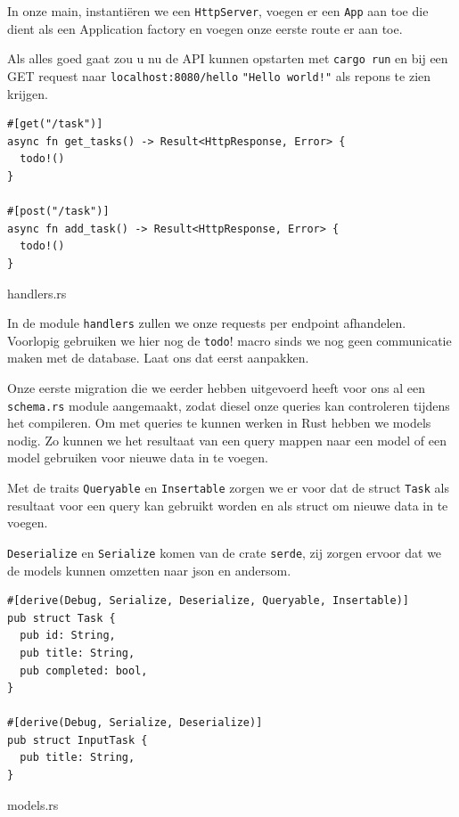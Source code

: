 In onze main, instantiëren we een \texttt{HttpServer}, voegen er een
\texttt{App} aan toe die dient als een
Application factory en voegen onze eerste route er aan toe.

Als alles goed gaat zou u nu de API kunnen opstarten met \texttt{cargo run} en bij een
GET request naar \texttt{localhost:8080/hello} \texttt{"Hello world!"} als repons 
te zien krijgen.

\begin{listing}[h]
\begin{verbatim}
#[get("/task")]
async fn get_tasks() -> Result<HttpResponse, Error> {
  todo!()
}

#[post("/task")]
async fn add_task() -> Result<HttpResponse, Error> {
  todo!()
}
\end{verbatim}
\caption{handlers.rs}
\end{listing}

In de module \texttt{handlers} zullen we onze requests per endpoint afhandelen. Voorlopig
gebruiken we hier nog de \texttt{todo}! macro sinds we nog geen communicatie maken met de
database. Laat ons dat eerst aanpakken.

Onze eerste migration die we eerder hebben uitgevoerd heeft voor ons al een
\texttt{schema.rs} module aangemaakt, zodat diesel onze queries kan controleren tijdens
het compileren. Om met queries te kunnen werken in Rust hebben we models nodig. Zo kunnen we het
resultaat van een query mappen naar een model of een model gebruiken voor nieuwe data in te voegen.

Met de traits \texttt{Queryable} en \texttt{Insertable} zorgen we er voor dat de
struct \texttt{Task} als resultaat voor een query kan gebruikt worden en als struct om
nieuwe data in te voegen.

\texttt{Deserialize} en \texttt{Serialize} komen van de crate
\texttt{serde}, zij zorgen ervoor dat we de models kunnen omzetten naar json en andersom.

\clearpage

\begin{listing}[h]
\begin{verbatim}
#[derive(Debug, Serialize, Deserialize, Queryable, Insertable)]
pub struct Task {
  pub id: String,
  pub title: String,
  pub completed: bool,
}

#[derive(Debug, Serialize, Deserialize)]
pub struct InputTask {
  pub title: String,
}
\end{verbatim}
\caption{models.rs}
\end{listing}

